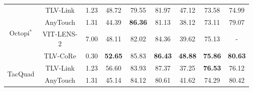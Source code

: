 \documentclass[letterpaper]{article} %
\theoremstyle{definition}                %
\theoremstyle{plain}                     %
\theoremstyle{remark}                    %
\begin{document}
\begin{table}[ht!]
\begin{tabular}{@{}c|c|c|ccc|c|c|
c@{}}
\multirow{4}{*}{Octopi$^\ast$}        & TLV-Link     &   1.23        &     {\cellcolor[HTML]{E2F0D9}48.72}     &       {\cellcolor[HTML]{E2F0D9}79.55}       &     {\cellcolor[HTML]{E2F0D9}81.97}     &          {\cellcolor[HTML]{E2F0D9}47.12}                         &     {\cellcolor[HTML]{E2F0D9}73.58}  & \multicolumn{1}{c}{{\cellcolor[HTML]{E2F0D9}74.99}}                             \\
                               & AnyTouch     &  1.31         &    {\cellcolor[HTML]{E2F0D9}44.39}     &      {\cellcolor[HTML]{E2F0D9}\textbf{86.36}}        &     {\cellcolor[HTML]{E2F0D9}81.13}    &  {\cellcolor[HTML]{E2F0D9}38.12}                                 &     {\cellcolor[HTML]{E2F0D9}73.11}       & \multicolumn{1}{c}{{\cellcolor[HTML]{E2F0D9}79.07}}                       \\
                               & VIT-LENS-2   &  7.00         &     {\cellcolor[HTML]{E2F0D9}48.11}     &      {\cellcolor[HTML]{E2F0D9}82.02}        &     {\cellcolor[HTML]{E2F0D9}84.36}     &    {\cellcolor[HTML]{E2F0D9}39.62}            &        {\cellcolor[HTML]{E2F0D9}75.13}           &    \multicolumn{1}{c}{{\cellcolor[HTML]{E2F0D9}-}}                               \\
                               & TLV-CoRe     &  0.30         &       {\cellcolor[HTML]{E2F0D9}\textbf{52.65}}   &     {\cellcolor[HTML]{E2F0D9}85.83}         &   {\cellcolor[HTML]{E2F0D9}\textbf{86.43}}       &    {\cellcolor[HTML]{E2F0D9}\textbf{48.88}}                               &  {\cellcolor[HTML]{E2F0D9}\textbf{75.86}}                          &    \multicolumn{1}{c}{{\cellcolor[HTML]{E2F0D9}\textbf{80.63}}}   \\ \midrule
\multirow{4}{*}{TacQuad}                          & TLV-Link  &  1.23            &   {\cellcolor[HTML]{E8F1F9}56.60}        &       {\cellcolor[HTML]{E8F1F9}83.93}       &    {\cellcolor[HTML]{E8F1F9}87.37}       &          {\cellcolor[HTML]{E8F1F9}37.25} &           {\cellcolor[HTML]{E8F1F9}\textbf{76.53}}     &    \multicolumn{1}{c}{{\cellcolor[HTML]{E8F1F9}76.12}}              \\
                                                  & AnyTouch  &   1.31           &  {\cellcolor[HTML]{E8F1F9}45.14}      &     {\cellcolor[HTML]{E8F1F9}84.12}         &   {\cellcolor[HTML]{E8F1F9}80.61}       &             {\cellcolor[HTML]{E8F1F9}41.62}                      &                    {\cellcolor[HTML]{E8F1F9}74.29}     & \multicolumn{1}{c}{{\cellcolor[HTML]{E8F1F9}80.42}}     \\

\end{tabular}
\end{table}
\end{document}
